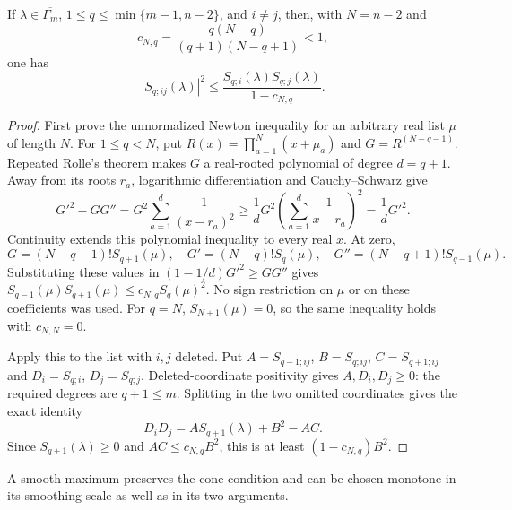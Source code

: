 \begin{lemma}\label{hessian:deleted-newton}
If $\lambda\in\overline{\Gamma_m}$, $1\leq q\leq\min\{m-1,n-2\}$, and $i\ne j$,
then, with $N=n-2$ and
\[
 c_{N,q}=\frac{q(N-q)}{(q+1)(N-q+1)}<1,
\]
one has
\[
 |S_{q;ij}(\lambda)|^2
 \leq\frac{S_{q;i}(\lambda)S_{q;j}(\lambda)}{1-c_{N,q}}.
\]
\end{lemma}
\begin{proof}
First prove the unnormalized Newton inequality for an arbitrary real
list $\mu$ of length $N$. For $1\leq q<N$, put
$R(x)=\prod_{a=1}^N(x+\mu_a)$ and
$G=R^{(N-q-1)}$. Repeated Rolle's theorem makes $G$ a real-rooted
polynomial of degree $d=q+1$. Away from its roots $r_a$, logarithmic
differentiation and Cauchy--Schwarz give
\[
 G'^2-GG''=G^2\sum_{a=1}^d\frac1{(x-r_a)^2}
 \geq \frac1dG^2\left(\sum_{a=1}^d\frac1{x-r_a}\right)^2
 =\frac1dG'^2.
\]
Continuity extends this polynomial inequality to every real $x$.
At zero,
\[
 G=(N-q-1)!S_{q+1}(\mu),\quad
 G'=(N-q)!S_q(\mu),\quad
 G''=(N-q+1)!S_{q-1}(\mu).
\]
Substituting these values in $(1-1/d)G'^2\geq GG''$ gives
$S_{q-1}(\mu)S_{q+1}(\mu)\leq c_{N,q}S_q(\mu)^2$.
No sign restriction on $\mu$ or on these coefficients was used.
For $q=N$, $S_{N+1}(\mu)=0$, so the same inequality holds
with $c_{N,N}=0$.

Apply this to the list with $i,j$ deleted. Put
$A=S_{q-1;ij}$, $B=S_{q;ij}$, $C=S_{q+1;ij}$ and
$D_i=S_{q;i}$, $D_j=S_{q;j}$. Deleted-coordinate positivity gives
$A,D_i,D_j\geq0$: the required degrees are $q+1\leq m$.
Splitting in the two omitted coordinates gives the exact identity
\[
 D_iD_j=A S_{q+1}(\lambda)+B^2-AC.
\]
Since $S_{q+1}(\lambda)\geq0$ and $AC\leq c_{N,q}B^2$, this is
at least $(1-c_{N,q})B^2$.
\end{proof}

A smooth maximum preserves the cone condition and can be chosen
monotone in its smoothing scale as well as in its two arguments.


